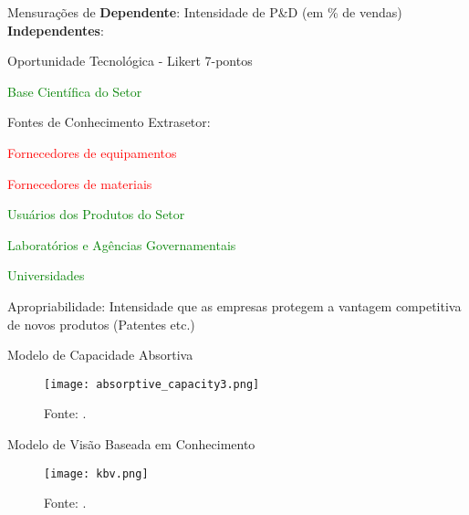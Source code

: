 \begin{frame}{Mensurações de \textcite{cohen1990absorptive}}
	\textbf{Dependente}: Intensidade de P\&D (em \% de vendas)
	\vfill
	\textbf{Independentes}:
	\begin{vfilleditems}
	\item Oportunidade Tecnológica - Likert 7-pontos
		\begin{vfilleditems}
		\item \textcolor{green}{Base Científica do Setor}
		\item Fontes de Conhecimento Extrasetor:
			\begin{vfilleditems}
			\item \textcolor{red}{Fornecedores de equipamentos}
			\item \textcolor{red}{Fornecedores de materiais}
			\item \textcolor{green}{Usuários dos Produtos do Setor}
			\item \textcolor{green}{Laboratórios e Agências Governamentais}
			\item \textcolor{green}{Universidades}
			\end{vfilleditems}
		\end{vfilleditems}
	\item Apropriabilidade: Intensidade que as empresas protegem a vantagem competitiva de novos produtos (Patentes etc.)
	\end{vfilleditems}
\end{frame}

\begin{frame}{Modelo de Capacidade Absortiva}
	\begin{figure}
		\centering
		\texttt{[image: absorptive\_capacity3.png]}
		\caption{Fonte: \textcite{zahra2002absorptive}.}
		\label{fig:absorptive_capacity3}
	\end{figure}
\end{frame}

\begin{frame}{Modelo de Visão Baseada em Conhecimento}
	\begin{figure}
		\centering
		\texttt{[image: kbv.png]}
		\caption{Fonte: \textcite{staples2001opportunities}.}
		\label{fig:kbv}
	\end{figure}
\end{frame}
